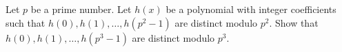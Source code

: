 Let $p$ be a prime number. Let $h(x)$ be a polynomial with integer coefficients
such that $h(0), h(1), \dots, h(p^2-1)$ are distinct modulo $p^2$.
Show that $h(0), h(1), \dots, h(p^3-1)$ are distinct modulo $p^3$.
